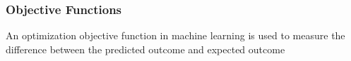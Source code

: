 \subsubsection{Objective Functions}
An optimization objective function in machine learning is used to measure the difference between the predicted outcome and expected outcome